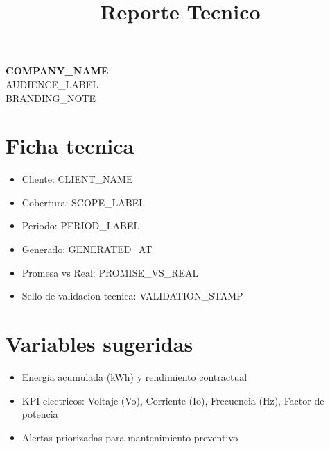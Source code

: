 \documentclass[11pt]{article}
\title{Reporte Tecnico}
\date{}
\begin{document}
\begin{center}
{\LARGE \textbf{{{COMPANY_NAME}}}}\\
\vspace{0.3cm}
{\large {{AUDIENCE_LABEL}}}\\
\small {{BRANDING_NOTE}}
\end{center}

\vspace{0.5cm}
\section*{Ficha tecnica}
\begin{itemize}
  \item Cliente: {{CLIENT_NAME}}
  \item Cobertura: {{SCOPE_LABEL}}
  \item Periodo: {{PERIOD_LABEL}}
  \item Generado: {{GENERATED_AT}}
  \item Promesa vs Real: {{PROMISE_VS_REAL}}
  \item Sello de validacion tecnica: {{VALIDATION_STAMP}}
\end{itemize}

\section*{Variables sugeridas}
\begin{itemize}
  \item Energia acumulada (kWh) y rendimiento contractual
  \item KPI electricos: Voltaje (Vo), Corriente (Io), Frecuencia (Hz), Factor de potencia
  \item Alertas priorizadas para mantenimiento preventivo
\end{itemize}
\end{document}
